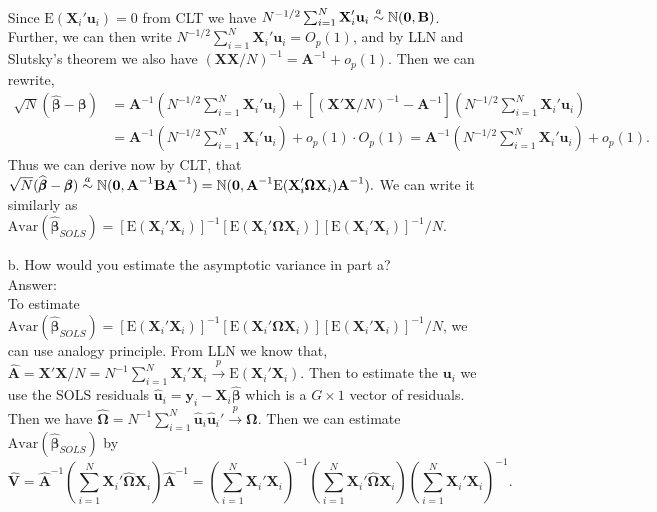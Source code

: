 \documentclass[10pt]{article}
\newcommand\asym{\stackrel{\mathclap{a}}{\sim}}
\newcommand\convprob{\xrightarrow{p}}
\newcommand{\N}{\mathbb{N}}
\newcommand{\E}{\text{E}}
\newcommand{\Av}{\text{Avar}}
\begin{document}
\begin{enumerate}
\begin{align*}
\end{align*}
Since $\E(\textbf{X}_i'\textbf{u}_i)=0$ from CLT we have $N^{-1/2}\sum_{i=1}^N \textbf{X}_i'\textbf{u}_i\asym \N(\textbf{0},\textbf{B})$. Further, we can then write $N^{-1/2}\sum_{i=1}^N \textbf{X}_i'\textbf{u}_i=O_p(1)$, and by LLN and Slutsky's theorem we also have $(\textbf{X}\textbf{X}/N)^{-1}=\textbf{A}^{-1}+o_p(1).$ Then we can rewrite,
\begin{align*}
    \sqrt{N}(\hat{\pmb{\beta}}-\pmb{\beta})&=\textbf{A}^{-1}(N^{-1/2}\sum_{i=1}^N \textbf{X}_i'\textbf{u}_i)+[(\textbf{X}'\textbf{X}/N)^{-1}-\textbf{A}^{-1}](N^{-1/2}\sum_{i=1}^N \textbf{X}_i'\textbf{u}_i)\\
    &=\textbf{A}^{-1}(N^{-1/2}\sum_{i=1}^N \textbf{X}_i'\textbf{u}_i)+o_p(1)\cdot O_p(1)=\textbf{A}^{-1}(N^{-1/2}\sum_{i=1}^N \textbf{X}_i'\textbf{u}_i)+o_p(1).
\end{align*}
Thus we can derive now by CLT, that $\sqrt{N}(\hat{\pmb{\beta}}-\pmb{\beta})\asym \N(\textbf{0},\textbf{A}^{-1}\textbf{B}\textbf{A}^{-1})=\N(\textbf{0},\textbf{A}^{-1}\E(\textbf{X}_i'\pmb{\Omega}\textbf{X}_i)\textbf{A}^{-1}).$ We can write it similarly as $\Av(\hat{\pmb{\beta}}_{SOLS})=[\E(\textbf{X}_i'\textbf{X}_i)]^{-1}[\E(\textbf{X}_i'\pmb{\Omega}\textbf{X}_i)][\E(\textbf{X}_i'\textbf{X}_i)]^{-1}/N.$ 

\item[b.] How would you estimate the asymptotic variance in part a? 
\\ Answer:\\
To estimate $\Av(\hat{\pmb{\beta}}_{SOLS})=[\E(\textbf{X}_i'\textbf{X}_i)]^{-1}[\E(\textbf{X}_i'\pmb{\Omega}\textbf{X}_i)][\E(\textbf{X}_i'\textbf{X}_i)]^{-1}/N$, we can use analogy principle. From LLN we know that, $\hat{\textbf{A}}=\textbf{X}'\textbf{X}/N=N^{-1}\sum_{i=1}^N \textbf{X}_i'\textbf{X}_i\convprob \E(\textbf{X}_i'\textbf{X}_i)$. Then to estimate the $\textbf{u}_i$ we use the SOLS residuals $\hat{\textbf{u}}_i=\textbf{y}_i-\textbf{X}_i\hat{\pmb{\beta}}$ which is a $G\times 1$ vector of residuals. Then we have $\hat{\pmb{\Omega}}=N^{-1}\sum_{i=1}^N\hat{\textbf{u}}_i\hat{\textbf{u}}_i' \convprob \pmb{\Omega}$. Then we can estimate $\Av(\hat{\pmb{\beta}}_{SOLS})$ by
\[\hat{\textbf{V}}=\hat{\textbf{A}}^{-1}\left(\sum_{i=1}^N\textbf{X}_i'\hat{\pmb{\Omega}}\textbf{X}_i\right)\hat{\textbf{A}}^{-1}=\left(\sum_{i=1}^N \textbf{X}_i'\textbf{X}_i\right)^{-1}\left(\sum_{i=1}^N\textbf{X}_i'\hat{\pmb{\Omega}}\textbf{X}_i\right)\left(\sum_{i=1}^N \textbf{X}_i'\textbf{X}_i\right)^{-1}.\]


\end{enumerate}
\end{document}
